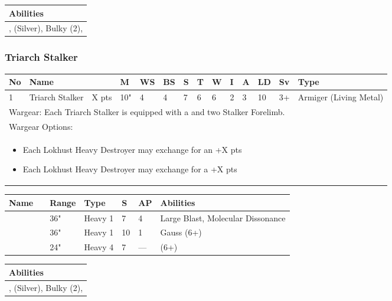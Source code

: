 \noindent
\begin{tabular}{||m{532pt}||}
	\hline
	Abilities \\
	\hline
	\quickref{Annihilation Protocols}, \quickref{Awakening Protocols} (Silver), Bulky (2), \quickref{Reanimation Protocols} \\
	\hline
\end{tabular}


\newpage
\subsubsection{Triarch Stalker}

\noindent
\begin{tabular}{||m{10pt} m{90pt} m{30pt} m{11pt} m{11pt} m{11pt} m{11pt} m{11pt} m{11pt} m{11pt} m{11pt} m{11pt} m{11pt} m{135pt}||}
	\hline
	No & Name & & M & WS & BS & S & T & W & I & A & LD & Sv & Type \\
	\hline
	1 & Triarch Stalker & X pts & 10" & 4 & 4 & 7 & 6 & 6 & 2 & 3 & 10 & 3+ & Armiger (Living Metal)\\
	\hline
	\hline
	\multicolumn{14}{||Z{532 pt}||}{Wargear: Each Triarch Stalker is equipped with a \quickref{Heat Ray} and two Stalker Forelimb.} \\
	\multicolumn{14}{||Z{532 pt}||}{Wargear Options:} \\	\multicolumn{14}{||Z{532 pt}||}{\begin{itemize}
			\item Each Lokhust Heavy Destroyer may exchange \quickref{Gauss Destructor} for an \quickref{Enmitic Exterminator} \hrulefill +X pts
			\item Each Lokhust Heavy Destroyer may exchange \quickref{Gauss Destructor} for a \quickref{Tesla Destructor} \hrulefill +X pts
	\end{itemize}} \\
	\hline
\end{tabular}

\noindent
\begin{tabular}{||m{110pt} m{30pt} m{31pt} m{55pt} m{12pt} m{12pt} m{210pt}||}
	\hline
	Name & & Range & Type & S & AP & Abilities \\
	\hline
	\quickref{Enmitic Exterminator} &  & 36" & Heavy 1 & 7 & 4 & Large Blast, Molecular Dissonance \\
	\quickref{Gauss Destructor} &  & 36" & Heavy 1 & 10 & 1 &  Gauss (6+) \\
	\quickref{Tesla Destructor} &  & 24" & Heavy 4 & 7 & — &  \quickref{Tesla} (6+) \\
	\hline
\end{tabular}

\noindent
\begin{tabular}{||m{532pt}||}
	\hline
	Abilities \\
	\hline
	\quickref{Annihilation Protocols}, \quickref{Awakening Protocols} (Silver), Bulky (2), \quickref{Reanimation Protocols} \\
	\hline
\end{tabular}
